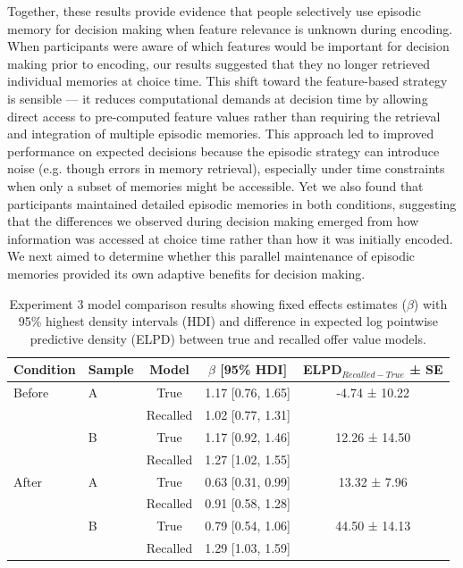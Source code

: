 \documentclass[10pt,letterpaper]{article}
\begin{document}
Together, these results provide evidence that people selectively use episodic memory for decision making when feature relevance is unknown during encoding. When participants were aware of which features would be important for decision making prior to encoding, our results suggested that they no longer retrieved individual memories at choice time. This shift toward the feature-based strategy is sensible --- it reduces computational demands at decision time by allowing direct access to pre-computed feature values rather than requiring the retrieval and integration of multiple episodic memories. This approach led to improved performance on expected decisions because the episodic strategy can introduce noise (e.g. though errors in memory retrieval), especially under time constraints when only a subset of memories might be accessible. Yet we also found that participants maintained detailed episodic memories in both conditions, suggesting that the differences we observed during decision making emerged from how information was accessed at choice time rather than how it was initially encoded. We next aimed to determine whether this parallel maintenance of episodic memories provided its own adaptive benefits for decision making.

\begin{table}[t]
\centering
\begin{tabular}{llccc}
\hline
Condition & Sample & Model & $\beta$ [95\% HDI] & ELPD$_{Recalled-True}$ ± SE \\
\hline
Before & A & True & 1.17 [0.76, 1.65] & -4.74 ± 10.22 \\
       &   & Recalled & 1.02 [0.77, 1.31] & \\
       & B & True & 1.17 [0.92, 1.46] & 12.26 ± 14.50 \\
       &   & Recalled & 1.27 [1.02, 1.55] & \\
\hline
After  & A & True & 0.63 [0.31, 0.99] & 13.32 ± 7.96 \\
       &   & Recalled & 0.91 [0.58, 1.28] & \\
       & B & True & 0.79 [0.54, 1.06] & 44.50 ± 14.13 \\
       &   & Recalled & 1.29 [1.03, 1.59] & \\
\hline
\end{tabular}
\caption{Experiment 3 model comparison results showing fixed effects estimates ($\beta$) with 95\% highest density intervals (HDI) and difference in expected log pointwise predictive density (ELPD) between true and recalled offer value models.}
\label{tab:modelcomparison}
\end{table}
\end{document}
